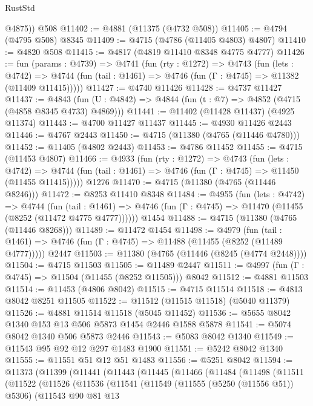 \begin{lexlean}{RustStd}
\begin{coremodule}
        @4875))
    @508
@11402 := @4881 (@11375 (@4732 @508))
@11405 := @4794 (@4795 @508) @8345
@11409 := @4715 (@4786 (@11405 @4803) @4807)
@11410 := @4820 @508
@11415 := @4817 (@4819 @11410 @8348 @4775 @4777)
@11426 := fun (params : @4739) =>
  @4741
    (fun (rty : @1272) =>
    @4743
      (fun (lets : @4742) =>
      @4744 (fun (tail : @1461) => @4746 (fun (Γ : @4745) => @11382 (@11409 @11415)))))
@11427 := @4740 @11426
@11428 := @4737 @11427
@11437 := @4843 (fun (U : @4842) => @4844 (fun (t : @7) => @4852 (@4715 (@4858 @8345 @4733) @4869)))
@11441 := @11402 (@11428 @11437) (@4925 @11374)
@11443 := @4700 @11427 @11437
@11445 := @4930 @11426 @2443
@11446 := @4767 @2443
@11450 := @4715 (@11380 (@4765 (@11446 @4780)))
@11452 := @11405 (@4802 @2443)
@11453 := @4786 @11452
@11455 := @4715 (@11453 @4807)
@11466 := @4933
    (fun (rty : @1272) =>
    @4743
      (fun (lets : @4742) =>
      @4744 (fun (tail : @1461) => @4746 (fun (Γ : @4745) => @11450 (@11455 @11415)))))
    @1276
@11470 := @4715 (@11380 (@4765 (@11446 @8246)))
@11472 := @8253 @11410 @8348
@11484 := @4955
    (fun (lets : @4742) =>
    @4744
      (fun (tail : @1461) =>
      @4746 (fun (Γ : @4745) => @11470 (@11455 (@8252 (@11472 @4775 @4777))))))
    @1454
@11488 := @4715 (@11380 (@4765 (@11446 @8268)))
@11489 := @11472 @1454
@11498 := @4979
    (fun (tail : @1461) => @4746 (fun (Γ : @4745) => @11488 (@11455 (@8252 (@11489 @4777)))))
    @2447
@11503 := @11380 (@4765 (@11446 (@8245 (@4774 @2448))))
@11504 := @4715 @11503
@11505 := @11489 @2447
@11511 := @4997 (fun (Γ : @4745) => @11504 (@11455 (@8252 @11505))) @8042
@11512 := @4881 @11503
@11514 := @11453 (@4806 @8042)
@11515 := @4715 @11514
@11518 := @4813 @8042 @8251 @11505
@11522 := @11512 (@11515 @11518) (@5040 @11379)
@11526 := @4881 @11514 @11518 (@5045 @11452)
@11536 := @5655 @8042 @1340 @153 @13 @506 @5873 @1454 @2446 @1588 @5878
@11541 := @5074 @8042 @1340 @506 @5873 @2446
@11543 := @5083 @8042 @1340
@11549 := @11543 @95 @92 @12 @297 @1483 @1900
@11551 := @5242 @8042 @1340
@11555 := @11551 @51 @12 @51 @1483
@11556 := @5251 @8042
@11594 := @11373
    (@11399
      (@11441
        (@11443
          (@11445
            (@11466
              (@11484
                (@11498
                  (@11511
                    (@11522
                      (@11526
                        (@11536
                          (@11541
                            (@11549
                              (@11555 (@5250 (@11556 @51)) @5306)
                              (@11543
                                @90
                                @81
                                @13

\end{coremodule}
\end{lexlean}
